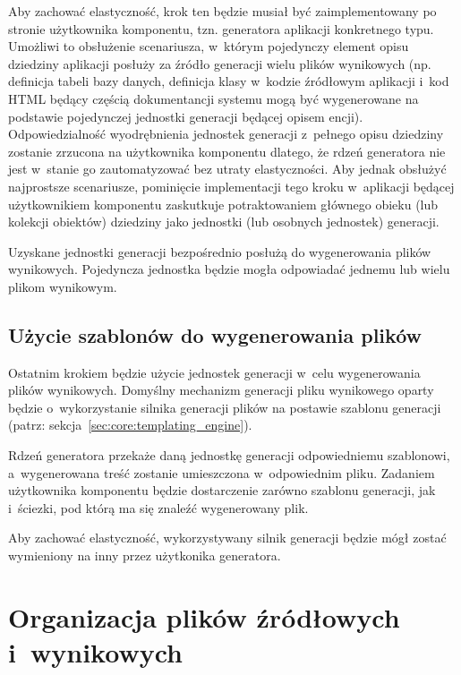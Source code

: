 Aby zachować elastyczność, krok ten będzie musiał być zaimplementowany po stronie użytkownika komponentu, tzn. generatora aplikacji konkretnego typu.
Umożliwi to obsłużenie scenariusza, w~którym pojedynczy element opisu dziedziny aplikacji posłuży za źródło generacji wielu plików wynikowych (np. definicja tabeli bazy danych, definicja klasy w~kodzie źródłowym aplikacji i~kod HTML będący częścią dokumentancji systemu mogą być wygenerowane na podstawie pojedynczej jednostki generacji będącej opisem encji).
Odpowiedzialność wyodrębnienia jednostek generacji z~pełnego opisu dziedziny zostanie zrzucona na użytkownika komponentu dlatego, że rdzeń generatora nie jest w~stanie go zautomatyzować bez utraty elastyczności.
Aby jednak obsłużyć najprostsze scenariusze, pominięcie implementacji tego kroku w~aplikacji będącej użytkownikiem komponentu zaskutkuje potraktowaniem głównego obieku (lub kolekcji obiektów) dziedziny jako jednostki (lub osobnych jednostek) generacji.

Uzyskane jednostki generacji bezpośrednio posłużą do wygenerowania plików wynikowych. Pojedyncza jednostka będzie mogła odpowiadać jednemu lub wielu plikom wynikowym.


\subsection{Użycie szablonów do wygenerowania plików}

Ostatnim krokiem będzie użycie jednostek generacji w~celu wygenerowania plików wynikowych.
Domyślny mechanizm generacji pliku wynikowego oparty będzie o~wykorzystanie silnika generacji plików na postawie szablonu generacji (patrz: sekcja~\ref{sec:core:templating_engine}).

Rdzeń generatora przekaże daną jednostkę generacji odpowiedniemu szablonowi, a~wygenerowana treść zostanie umieszczona w~odpowiednim pliku.
Zadaniem użytkownika komponentu będzie dostarczenie zarówno szablonu generacji, jak i~ściezki, pod którą ma się znaleźć wygenerowany plik.

Aby zachować elastyczność, wykorzystywany silnik generacji będzie mógł zostać wymieniony na inny przez użytkonika generatora.



\section{Organizacja plików źródłowych i~wynikowych} \label{sec:core:files_structure}

